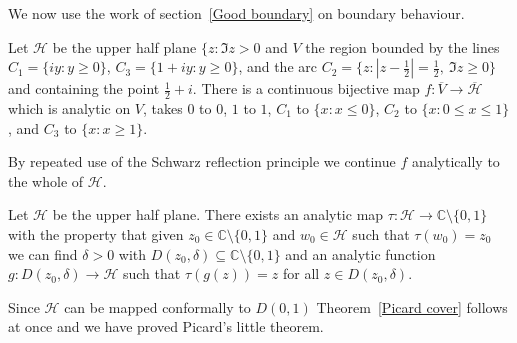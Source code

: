 We now use the work of section~\ref{Good boundary}
on boundary behaviour.
\begin{lemma} Let $\mathcal{H}$ be the upper half plane $\{z:\Im z>0$
and $V$ the region bounded by the lines $C_{1}=\{iy:y\geq 0\}$,
$C_{3}=\{1+iy:y\geq 0\}$,
and the arc $C_{2}=\{z:|z-\frac{1}{2}|=\frac{1}{2},\ \Im z\geq 0\}$
and containing the point $\frac{1}{2}+i$. There
is a continuous bijective map 
$f:\overline{V}\rightarrow \overline{\mathcal{H}}$
which is analytic on $V$, takes $0$ to $0$, $1$ to $1$,
$C_{1}$ to $\{x:x\leq 0\}$, $C_{2}$ to $\{x:0\leq x\leq 1\}$,
and $C_{3}$ to $\{x:x\geq  1\}$.
\end{lemma}
By repeated use of the Schwarz reflection principle
we continue $f$ analytically to the whole of $\mathcal{H}$.
\begin{lemma}\label{Picard cover upper}
Let $\mathcal{H}$ be the upper half plane.
There exists an analytic map 
$\tau:\mathcal{H}\rightarrow {\mathbb C}\setminus\{0,1\}$
with the property that given $z_{0}\in {\mathbb C}\setminus\{0,1\}$
and $w_{0}\in \mathcal{H}$ such that
$\tau(w_{0})=z_{0}$ we can find $\delta>0$ with
$D(z_{0},\delta)\subseteq {\mathbb C}\setminus\{0,1\}$ and 
an analytic function 
$g:D(z_{0},\delta)\rightarrow \mathcal{H}$
such that $\tau (g(z))=z$ for all $z\in D(z_{0},\delta)$.
\end{lemma}
Since $\mathcal{H}$ can be mapped conformally to $D(0,1)$
Theorem~\ref{Picard cover} follows at once and
we have proved Picard's little theorem.
